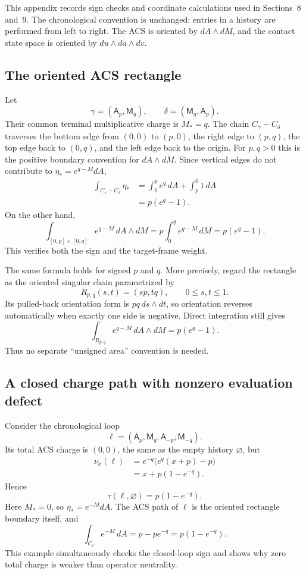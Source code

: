 This appendix records sign checks and coordinate calculations used in
Sections~8 and~9.  The chronological convention is unchanged: entries in a
history are performed from left to right.  The ACS is oriented by
\(dA\wedge dM\), and the contact state space is oriented by
\(du\wedge da\wedge dv\).

\subsection{The oriented ACS rectangle}

Let
\[
    \gamma=(\mathsf A_p,\mathsf M_q),
    \qquad
    \delta=(\mathsf M_q,\mathsf A_p).
\]
Their common terminal multiplicative charge is \(M_*=q\).  The chain
\(C_\gamma-C_\delta\) traverses the bottom edge from \((0,0)\) to \((p,0)\),
the right edge to \((p,q)\), the top edge back to \((0,q)\), and the left edge
back to the origin.  For \(p,q>0\) this is the positive boundary convention
for \(dA\wedge dM\).  Since vertical edges do not contribute to
\(\eta_*=e^{q-M}dA\),
\begin{align*}
    \int_{C_\gamma-C_\delta}\eta_*
      &=\int_0^p e^q\,dA+\int_p^0 1\,dA\\
      &=p(e^q-1).
\end{align*}
On the other hand,
\[
    \int_{[0,p]\times[0,q]}e^{q-M}\,dA\wedge dM
      =p\int_0^q e^{q-M}\,dM
      =p(e^q-1).
\]
This verifies both the sign and the target-frame weight.

The same formula holds for signed \(p\) and \(q\).  More precisely, regard the
rectangle as the oriented singular chain parametrized by
\[
    R_{p,q}(s,t)=(sp,tq),
    \qquad 0\le s,t\le1.
\]
Its pulled-back orientation form is \(pq\,ds\wedge dt\), so orientation
reverses automatically when exactly one side is negative.  Direct integration
still gives
\[
    \int_{R_{p,q}}e^{q-M}\,dA\wedge dM=p(e^q-1).
\]
Thus no separate ``unsigned area'' convention is needed.

\subsection{A closed charge path with nonzero evaluation defect}

Consider the chronological loop
\[
    \ell=(\mathsf A_p,\mathsf M_q,
           \mathsf A_{-p},\mathsf M_{-q}).
\]
Its total ACS charge is \((0,0)\), the same as the empty history
\(\varnothing\), but
\begin{align*}
    \nu_x(\ell)
      &=e^{-q}\bigl(e^q(x+p)-p\bigr)\\
      &=x+p(1-e^{-q}).
\end{align*}
Hence
\[
    \tau(\ell,\varnothing)=p(1-e^{-q}).
\]
Here \(M_*=0\), so \(\eta_*=e^{-M}dA\).  The ACS path of \(\ell\) is the
oriented rectangle boundary itself, and
\[
    \int_{C_\ell}e^{-M}\,dA
      =p-p e^{-q}
      =p(1-e^{-q}).
\]
This example simultaneously checks the closed-loop sign and shows why zero
total charge is weaker than operator neutrality.

